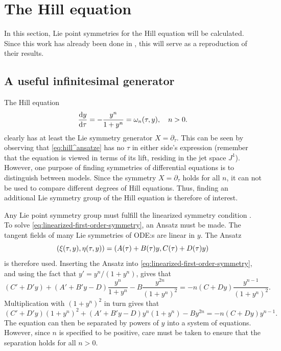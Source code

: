 \section{The Hill equation}

In this section, Lie point symmetries for the Hill equation will be calculated.
Since this work has already been done in \cite{ohlsson2020symmetry}, this will serve as a reproduction of their results.

\subsection{A useful infinitesimal generator}

The Hill equation
\begin{equation} \label{eq:hill^ansatze}
  \diff{y}{\tau} = - \frac{y^n}{1 + y^n} = \omega_n(\tau, y), \quad
  n > 0.
\end{equation}
clearly has at least the Lie symmetry generator \(X=\partial_\tau\).
This can be seen by observing that \cref{eq:hill^ansatze} has no \(\tau\) in either side's expression (remember that the equation is viewed in terms of its lift, residing in the jet space \(J^1\)).
However, one purpose of finding symmetries of differential equations is to distinguish between models.
Since the symmetry \(X=\partial_\tau\) holds for all \(n\), it can not be used to compare different degrees of Hill equations.
Thus, finding an additional Lie symmetry group of the Hill equation is therefore of interest.

Any Lie point symmetry group must fulfill the linearized symmetry condition .
To solve \cref{eq:linearized-first-order-symmetry}, an Ansatz must be made.
The tangent fields of many Lie symmetries of ODE:s are linear in \(y\).
The Ansatz
\begin{equation}
  \pqty{\xi(\tau,y),\eta(\tau,y)} = \pqty{A(\tau) + B(\tau)y,C(\tau) + D(\tau)y}
\end{equation}
is therefore used.
Inserting the Ansatz into \cref{eq:linearized-first-order-symmetry}, and using the fact that \(y' = y^n / (1 + y^n)\), gives that
\begin{equation}
  (C' + D'y) + (A' + B'y - D) \frac{y^n}{1 + y^n} - B \frac{y^{2n}}{(1 + y^n)^2} =
  -n(C + Dy) \frac{y^{n-1}}{(1 + y^n)^2}.
\end{equation}
Multiplication with \((1 + y^n)^2\) in turn gives that
\begin{equation} \label{eq:hill-linear-symmetry}
  (C' + D'y)(1 + y^n)^2 + (A' + B'y - D)y^n(1 + y^n) - By^{2n} =
  -n(C + Dy) y^{n-1}.
\end{equation}
The equation can then be separated by powers of \(y\) into a system of equations.
However, since \(n\) is specified to be positive, care must be taken to ensure that the separation holds for all \(n>0\).

